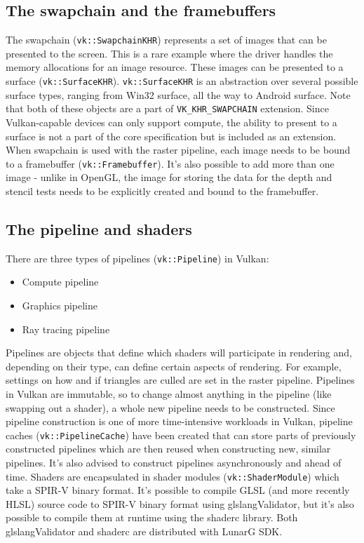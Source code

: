 \documentclass[times, utf8, zavrsni, numeric]{fer}
\begin{document}
\subsection{The swapchain and the framebuffers}
The swapchain (\texttt{vk::SwapchainKHR}) represents a set of images that can be presented to the screen. This is a rare example where the driver handles the memory allocations for an image resource. These images can be presented to a surface (\texttt{vk::SurfaceKHR}). \texttt{vk::SurfaceKHR} is an abstraction over several possible surface types, ranging from Win32 surface, all the way to Android surface. Note that both of these objects are a part of \texttt{VK\_KHR\_SWAPCHAIN} extension. Since Vulkan-capable devices can only support compute, the ability to present to a surface is not a part of the core specification but is included as an extension. When swapchain is used with the raster pipeline, each image needs to be bound to a framebuffer (\texttt{vk::Framebuffer}). It's also possible to add more than one image - unlike in OpenGL, the image for storing the data for the depth and stencil tests needs to be explicitly created and bound to the framebuffer.

\subsection{The pipeline and shaders}
There are three types of pipelines (\texttt{vk::Pipeline}) in Vulkan:
\begin{itemize}
\item{Compute pipeline}
\item{Graphics pipeline}
\item{Ray tracing pipeline}
\end{itemize}

Pipelines are objects that define which shaders will participate in rendering and, depending on their type, can define certain aspects of rendering. For example, settings on how and if triangles are culled are set in the raster pipeline. Pipelines in Vulkan are immutable, so to change almost anything in the pipeline (like swapping out a shader), a whole new pipeline needs to be constructed. Since pipeline construction is one of more time-intensive workloads in Vulkan, pipeline caches (\texttt{vk::PipelineCache}) have been created that can store parts of previously constructed pipelines which are then reused when constructing new, similar pipelines. It's also advised to construct pipelines asynchronously and ahead of time.
Shaders are encapsulated in shader modules (\texttt{vk::ShaderModule}) which take a SPIR-V binary format. It's possible to compile GLSL (and more recently HLSL) source code to SPIR-V binary format using glslangValidator, but it's also possible to compile them at runtime using the shaderc library. Both glslangValidator and shaderc are distributed with LunarG SDK.
\end{document}
